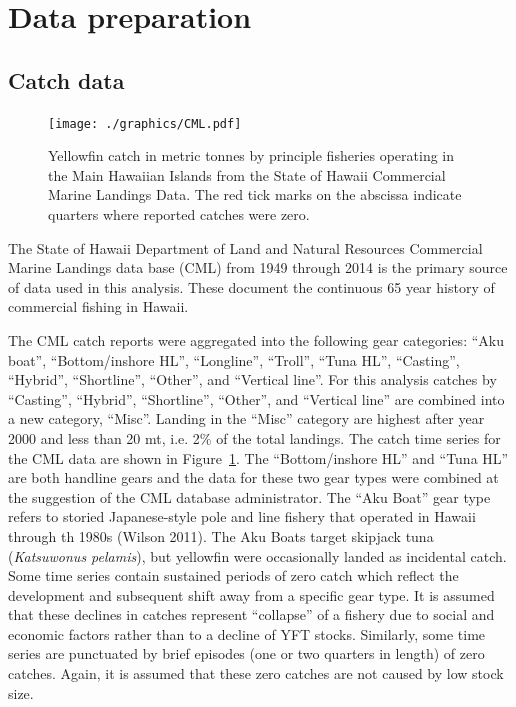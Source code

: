 \documentclass[12pt,letterpaper]{article}
\begin{document}
\clearpage


\appendix
\section{Data preparation}
\label{sec:data}

\subsection*{Catch data}

\begin{figure}
\begin{center}
\texttt{[image: ./graphics/CML.pdf]}
\caption{\label{fig:CMLdata}
Yellowfin catch in metric tonnes by principle fisheries operating in
the Main Hawaiian Islands from the State of Hawaii Commercial Marine
Landings Data.
The red tick marks on the abscissa indicate quarters where reported
catches were zero.
}
\end{center}
\end{figure}


The State of Hawaii Department of Land and Natural Resources
Commercial Marine Landings data base (CML) from 1949 through 2014 is
the primary source of data used in this analysis. These document the
continuous 65 year history of commercial fishing in Hawaii.


The CML catch reports were aggregated into the following gear categories:
``Aku boat'', ``Bottom/inshore HL'', ``Longline'',  ``Troll'', ``Tuna
HL'', ``Casting'', ``Hybrid'',  ``Shortline'', ``Other'', and
``Vertical line''.
For this analysis catches by ``Casting'', ``Hybrid'',
``Shortline'', ``Other'', and ``Vertical line'' are combined into a new
category, ``Misc''. Landing in the ``Misc'' category are highest after
year 2000 and less than 20 mt, i.e. 2\% of the total landings.
The catch time series for the CML data are shown in
Figure~\ref{fig:CMLdata}.
The ``Bottom/inshore HL'' and ``Tuna HL'' are both handline gears and
the data for these two gear types were combined at the suggestion of
the CML database administrator.
The ``Aku Boat'' gear type refers to storied Japanese-style pole and
line fishery that operated in Hawaii through th 1980s (Wilson 2011). 
The Aku Boats target skipjack tuna 
({\it Katsuwonus pelamis}), but yellowfin were occasionally landed as
incidental catch.
Some time series contain sustained periods of zero catch which
reflect the development and subsequent shift away from a specific
gear type. It is assumed that these declines in catches represent
``collapse'' of a fishery due to social and economic factors rather than
to a decline of YFT stocks.
Similarly, some time series are punctuated by brief episodes (one or two quarters in
length) of zero catches. Again, it is assumed that these zero catches
are not caused by low stock size.
\end{document}
